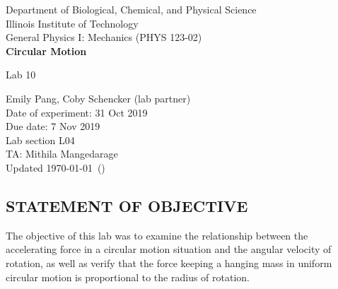 \documentclass [12pt, letterpaper, twoside] {article}
\begin{document}
\pgfplotsset{compat=1.16}

\begin {titlepage}
\begin {center}
Department of Biological, Chemical, and Physical Science\\
\vspace {0.1cm}
Illinois Institute of Technology\\
\vspace {0.1cm}
General Physics I: Mechanics (PHYS 123-02)\\
\vspace* {\fill}
\begingroup
\Large
\textbf {Circular Motion}
\vspace {0.35cm}

\normalsize
Lab 10
\vspace {1.5cm}
\endgroup
\vspace* {\fill}
\end {center}

\vspace*{\fill}
\begin {flushright}
\footnotesize
Emily Pang, Coby Schencker (lab partner)\\
Date of experiment: 31 Oct 2019\\
Due date: 7 Nov 2019\\
Lab section L04\\
TA: Mithila Mangedarage\\
Updated \usdate\today~(\currenttime)
\end {flushright}
\end {titlepage}
\pgfplotsset{compat=1.7}
\subsection* {STATEMENT OF OBJECTIVE}
The objective of this lab was to examine the relationship between the accelerating force in a circular motion situation and the angular velocity of rotation, as well as verify that the force keeping a hanging mass in uniform circular motion is proportional to the radius of rotation.
\end{document}
